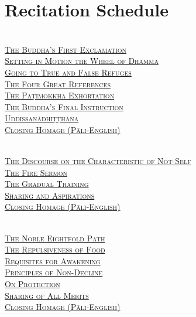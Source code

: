 \section{Recitation Schedule}
\label{schedule}

\begin{center}

  {\libertinusFont\selectfont\textbf{\textsc{}}}\\

  \textsc{
    \hyperref[buddhas-first-exclamation]{The Buddha's First Exclamation}\\
    \hyperref[wheel-of-dhamma-abridged]{Setting in Motion the Wheel of Dhamma}\\
    \hyperref[true-false-refuges]{Going to True and False Refuges}\\
    \hyperref[four-great-references]{The Four Great References}\\
    \hyperref[patimokkha-exhortation]{The Pāṭimokkha Exhortation}\\
    \hyperref[buddhas-final-instruction]{The Buddha's Final Instruction}\\
    \hyperref[uddissanadhitthana]{Uddissanādhiṭṭhāna}\\
    \hyperref[closing-homage]{Closing Homage (Pāli-English)}}\\

  \bigskip

  {\libertinusFont\selectfont\textbf{\textsc{}}}\\

  \textsc{
    \hyperref[characteristic-of-not-self]{The Discourse on the Characteristic of Not-Self}\\
    \hyperref[fire-sermon]{The Fire Sermon}\\
    \hyperref[gradual-training]{The Gradual Training}\\
    \hyperref[noble-eightfold-path]{Sharing and Aspirations}\\
    \hyperref[closing-homage]{Closing Homage (Pāli-English)}}\\

  \bigskip

  {\libertinusFont\selectfont\textbf{\textsc{}}}\\

  \textsc{
    \hyperref[noble-eightfold-path]{The Noble Eightfold Path}\\
    \hyperref[repulsiveness-of-food]{The Repulsiveness of Food}\\
    \hyperref[requisites-for-awakening]{Requisites for Awakening}\\
    \hyperref[principles-of-non-decline]{Principles of Non-Decline}\\
    \hyperref[protection]{On Protection}\\
    \hyperref[sharing-all-merits]{Sharing of All Merits}\\
    \hyperref[closing-homage]{Closing Homage (Pāli-English)}}\\


\end{center}
